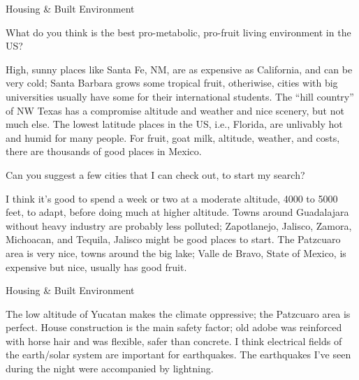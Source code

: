\documentclass[11pt,oneside,openany,extrafontsizes]{memoir}
\begin{document}
\begin{emailexchange}{Housing \& Built Environment}

    \begin{question}
        What do you think is the best pro-metabolic, pro-fruit living environment in the US?
    \end{question}

    \begin{answer}
      High, sunny places like Santa Fe, NM, are as expensive as California, and can be very cold; Santa Barbara grows some tropical fruit, otheriwise, cities with big universities usually have some for their international students. The \enquote{hill country} of NW Texas has a compromise altitude and weather and nice scenery, but not much else. The lowest latitude places in the US, i.e., Florida, are unlivably hot and humid for many people. For fruit, goat milk, altitude, weather, and costs, there are thousands of good places in Mexico.
    \end{answer}

    \begin{question}
        Can you suggest a few cities that I can check out, to start my search?
    \end{question}

    \begin{answer}
       I think it's good to spend a week or two at a moderate altitude, 4000 to 5000 feet, to adapt, before doing much at higher altitude. Towns around Guadalajara without heavy industry are probably less polluted; Zapotlanejo, Jalisco, Zamora, Michoacan, and Tequila, Jalisco might be good places to start. The Patzcuaro area is very nice, towns around the big lake; Valle de Bravo, State of Mexico, is expensive but nice, usually has good fruit.
    \end{answer}
\end{emailexchange}

\begin{standalonequote}{Housing \& Built Environment}

    \begin{answer}
      The low altitude of Yucatan makes the climate oppressive; the Patzcuaro area is perfect. House construction is the main safety factor; old adobe was reinforced with horse hair and was flexible, safer than concrete. I think electrical fields of the earth/solar system are important for earthquakes. The earthquakes I've seen during the night were accompanied by lightning.
    \end{answer}
\end{standalonequote}
\end{document}

